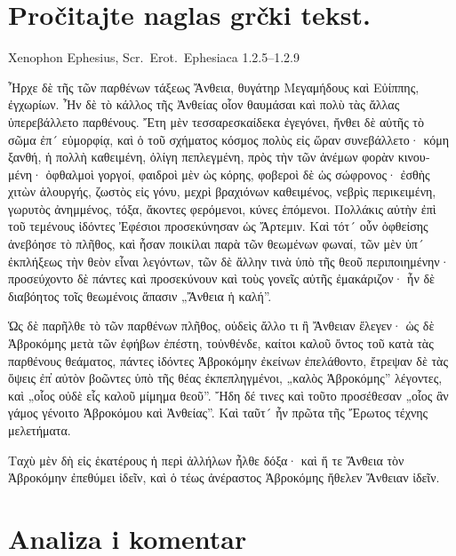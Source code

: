 
\section*{Pročitajte naglas grčki tekst.}

Xenophon Ephesius, Scr.\ Erot.\ Ephesiaca 1.2.5–1.2.9


\medskip


{\large

\begin{greek}

\noindent Ἦρχε δὲ τῆς τῶν παρθένων τάξεως Ἄνθεια, θυγάτηρ Μεγαμήδους καὶ Εὐίππης, ἐγχωρίων. Ἦν δὲ τὸ κάλλος τῆς Ἀνθείας οἷον θαυμάσαι καὶ πολὺ τὰς ἄλλας ὑπερεβάλλετο παρθένους. Ἔτη μὲν τεσσαρεσκαίδεκα ἐγεγόνει, ἤνθει δὲ αὐτῆς τὸ σῶμα ἐπ´ εὐμορφίᾳ, καὶ ὁ τοῦ σχήματος κόσμος πολὺς εἰς ὥραν συνεβάλλετο· κόμη ξανθή, ἡ πολλὴ καθειμένη, ὀλίγη πεπλεγμένη, πρὸς τὴν τῶν ἀνέμων φορὰν κινουμένη· ὀφθαλμοὶ γοργοί, φαιδροὶ μὲν ὡς κόρης, φοβεροὶ δὲ ὡς σώφρονος· ἐσθὴς χιτὼν ἁλουργής, ζωστὸς εἰς γόνυ, μεχρὶ βραχιόνων καθειμένος, νεβρὶς περικειμένη, γωρυτὸς ἀνημμένος, τόξα, ἄκοντες φερόμενοι, κύνες ἑπόμενοι. Πολλάκις αὐτὴν ἐπὶ τοῦ τεμένους ἰδόντες Ἐφέσιοι προσεκύνησαν ὡς Ἄρτεμιν. Καὶ τότ´ οὖν ὀφθείσης ἀνεβόησε τὸ πλῆθος, καὶ ἦσαν ποικίλαι παρὰ τῶν θεωμένων φωναί, τῶν μὲν ὑπ´ ἐκπλήξεως τὴν θεὸν εἶναι λεγόντων, τῶν δὲ ἄλλην τινὰ ὑπὸ τῆς θεοῦ περιποιημένην· προσεύχοντο δὲ πάντες καὶ προσεκύνουν καὶ τοὺς γονεῖς αὐτῆς ἐμακάριζον· ἦν δὲ διαβόητος τοῖς θεωμένοις ἅπασιν „Ἄνθεια ἡ καλή”. 

Ὡς δὲ παρῆλθε τὸ τῶν παρθένων πλῆθος, οὐδεὶς ἄλλο τι ἢ Ἄνθειαν ἔλεγεν· ὡς δὲ Ἁβροκόμης μετὰ τῶν ἐφήβων ἐπέστη, τοὐνθένδε, καίτοι καλοῦ ὄντος τοῦ κατὰ τὰς παρθένους θεάματος, πάντες ἰδόντες Ἁβροκόμην ἐκείνων ἐπελάθοντο, ἔτρεψαν δὲ τὰς ὄψεις ἐπ̓ αὐτὸν βοῶντες ὑπὸ τῆς θέας ἐκπεπληγμένοι, „καλὸς Ἁβροκόμης” λέγοντες, καὶ „οἷος οὐδὲ εἷς καλοῦ μίμημα θεοῦ”. Ἤδη δέ τινες καὶ τοῦτο προσέθεσαν „οἷος ἂν γάμος γένοιτο Ἁβροκόμου καὶ Ἀνθείας”. Καὶ ταῦτ´ ἦν πρῶτα τῆς Ἔρωτος τέχνης μελετήματα.

Ταχὺ μὲν δὴ εἰς ἑκατέρους ἡ περὶ ἀλλήλων ἦλθε δόξα· καὶ ἥ τε Ἄνθεια τὸν Ἁβροκόμην ἐπεθύμει ἰδεῖν, καὶ ὁ τέως ἀνέραστος Ἁβροκόμης ἤθελεν Ἄνθειαν ἰδεῖν.

\end{greek}

}


\section*{Analiza i komentar}

